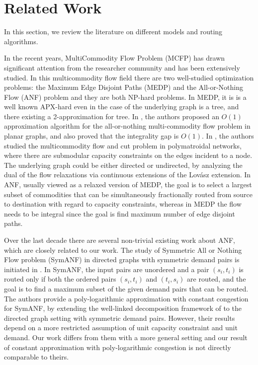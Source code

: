 \documentclass[conference]{IEEEtran}
\begin{document}
\section{Related Work} \label{sec:relatedwork}
In this section, we review the literature on different models and routing algorithms.

In the recent years, MultiCommodity Flow Problem (MCFP) has drawn significant attention from the researcher community and has been extensively studied. In this multicommodity flow field there are two well-studied optimization problems: the Maximum Edge Disjoint Paths (MEDP) and the All-or-Nothing Flow (ANF) problem and they are both NP-hard problems. 
In MEDP, it is is a well known APX-hard even in the case of the underlying graph is a tree, and there existing a 2-approximation for tree. In \cite{Chuzhoy12a}, the authors proposed an $O(1)$ approximation algorithm for the all-or-nothing multi-commodity flow problem in planar graphs, and also proved that the integrality gap is $O(1)$. In \cite{ChekuriKRV15}, the authors studied the multicommodity flow and cut problem in polymatroidal networks, where there are submodular capacity constraints on the edges incident to a node. The underlying graph could be either directed or undirected, by analyzing the dual of the flow relaxations via continuous extensions of the Lov\'asz extension. 
In ANF, usually viewed as a relaxed version of MEDP, the goal is to select a largest subset of commodities that can be simultaneously fractionally routed from source to destination with regard to capacity constraints, whereas in MEDP the flow needs to be integral since the goal is find maximum number of edge disjoint paths.

Over the last decade there are several non-trivial existing work about ANF, which are closely related to our work. The study of Symmetric All or Nothing Flow problem (SymANF) in directed graphs with symmetric demand pairs is initiated in \cite{ChekuriE15}. In SymANF, the input pairs are unordered and a pair $(s_i, t_i)$ is routed only if both the ordered pairs $(s_i, t_i)$ and $(t_i, s_i)$ are routed, and the goal is to find a maximum subset of the given demand pairs that can be routed. The authors provide a poly-logarithmic approximation with constant congestion for SymANF, by extending the well-linked decomposition framework of \cite{ChekuriKS05} to the directed graph setting with symmetric demand pairs. However, their results depend on a more restricted assumption of unit capacity constraint and unit demand. Our work differs from them with a more general setting and our result of constant approximation with poly-logarithmic congestion is not directly comparable to theirs.
\end{document}
